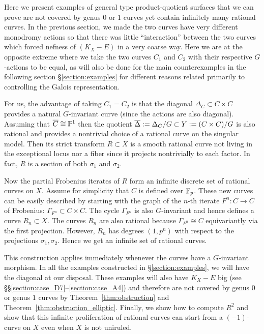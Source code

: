 \documentclass[main.tex]{subfiles}
\begin{document}
Here we present examples of general type product-quotient surfaces that we can prove are not covered by genus $0$ or $1$ curves yet contain infinitely many rational curves. In the previous section, we made the two curves have very different monodromy actions so that there was little ``interaction'' between the two curves which forced nefness of $(K_X - E)$ in a very coarse way. Here we are at the opposite extreme where we take the two curves $C_1$ and $C_2$ with their respective $G$-actions to be equal, as will also be done for the main counterexamples in the following section \S\ref{section:examples} for different reasons related primarily to controlling the Galois representation.
\par
For us, the advantage of taking $C_1 = C_2$ is that the diagonal $\Delta_C \subset C \times C$ provides a natural $G$-invariant curve (since the actions are also diagonal). Assuming that $\overline{C} \cong \mathbb{P}^1$ then the quotient $\overline{\Delta} := \Delta_C / G \subset Y := (C \times C)/G$ is also rational and provides a nontrivial choice of a rational curve on the singular model. Then its strict transform $R \subset X$ is a smooth rational curve not living in the exceptional locus nor a fiber since it projects nontrivially to each factor. In fact, $R$ is a section of both $\sigma_1$ and $\sigma_2$. 
\par 
Now the partial Frobenius iterates of $R$ form an infinite discrete set of rational curves on $X$. Assume for simplicity that $C$ is defined over $\mathbb{F}_p$. These new curves can be easily described by starting with the graph of the $n$-th iterate $F^n : C \to C$ of Frobenius: $\Gamma_{F^n} \subset C \times C$. The cycle $\Gamma_{F^n}$ is also $G$-invariant and hence defines a curve $R_n \subset X$. The curves $R_n$ are also rational because $\Gamma_{F^n} \cong C$ equivariantly via the first projection. However, $R_n$ has degrees $(1,p^n)$ with respect to the projections $\sigma_1, \sigma_2$. Hence we get an infinite set of rational curves. 
\par 
This construction applies immediately whenever the curves have a $G$-invariant morphism. In all the examples constructed in \S\ref{section:examples}, we will have the diagonal at our disposal. These examples will also have $K_X - E$ big (see \S\S\ref{section:case_D7}--\ref{section:case_A4}) and therefore are not covered by genus $0$ or genus $1$ curves by Theorem~\ref{thm:obstruction} and Theorem~\ref{thm:obstruction_elliptic}. Finally, we show how to compute $R^2$ and show that this infinite proliferation of rational curves can start from a $(-1)$-curve on $X$ even when $X$ is not uniruled.
\end{document}
